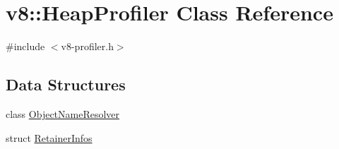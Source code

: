 \hypertarget{classv8_1_1HeapProfiler}{}\section{v8\+:\+:Heap\+Profiler Class Reference}
\label{classv8_1_1HeapProfiler}


{\ttfamily \#include $<$v8-\/profiler.\+h$>$}

\subsection*{Data Structures}
\begin{DoxyCompactItemize}
\item 
class \mbox{\hyperlink{classv8_1_1HeapProfiler_1_1ObjectNameResolver}{Object\+Name\+Resolver}}
\item 
struct \mbox{\hyperlink{structv8_1_1HeapProfiler_1_1RetainerInfos}{Retainer\+Infos}}
\end{DoxyCompactItemize}
